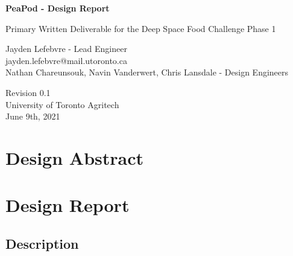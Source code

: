 \documentclass{report}
\begin{document}
\begin{titlepage}
    \begin{center}
        \vspace*{1.2cm}

        \textbf{\large{PeaPod - Design Report}}

        \vspace{0.5cm}

        Primary Written Deliverable for the Deep Space Food Challenge Phase 1

        \vfill

        Jayden Lefebvre - Lead Engineer\\\small{jayden.lefebvre@mail.utoronto.ca}\\
        \vspace{1cm}
        Nathan Chareunsouk, Navin Vanderwert, Chris Lansdale - Design Engineers

        \vspace{2.5cm}

        Revision 0.1\\
        University of Toronto Agritech\\
        June 9th, 2021

    \end{center}
\end{titlepage}

\thispagestyle{plain}

\tableofcontents
\newpage

\section{Design Abstract}

\section{Design Report}

\subsection{Description}
\end{document}
